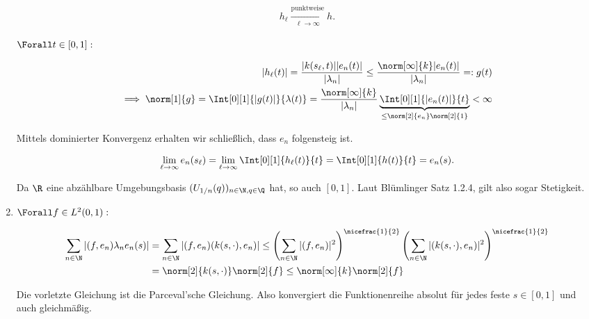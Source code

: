 \begin{solution}
\begin{enumerate}[label = (\alph*)]
  \begin{align*}
    h_\ell
    \xrightarrow
    [\ell \to \infty]
    {\text{punktweise}}
    h.
  \end{align*}

  $\Forall t \in [0, 1]:$

  \begin{align*}
    |h_\ell(t)|
    =
    \frac
    {
      |k(s_\ell, t)|
      |e_n(t)|
    }
    {|\lambda_n|}
    \leq
    \frac
    {
      \norm[\infty]{k}
      |e_n(t)|
    }
    {|\lambda_n|}
    =:
    g(t) \\
    \implies
    \norm[1]{g}
    =
    \Int[0][1]
    {|g(t)|}{\lambda(t)}
    =
    \frac
    {\norm[\infty]{k}}
    {|\lambda_n|}
    \underbrace
    {
      \Int[0][1]
      {|e_n(t)|}{t}
    }_{
      \leq
      \norm[2]{e_n}
      \norm[2]{1}
    }
    < \infty
  \end{align*}

  Mittels dominierter Konvergenz
  erhalten wir schließlich, dass $e_n$ folgensteig ist.

  \begin{align*}
    \lim_{\ell \to \infty}
    e_n(s_\ell)
    =
    \lim_{\ell \to \infty}
    \Int[0][1]{h_\ell(t)}{t}
    =
    \Int[0][1]{h(t)}{t}
    =
    e_n(s).
  \end{align*}


  Da $\R$ eine abzählbare Umgebungsbasis $(U_{1/n}(q))_{n \in \N, q \in \Q}$ hat, so auch $[0, 1]$.
  Laut Blümlinger Satz 1.2.4, gilt also sogar Stetigkeit.

  \item
  $\Forall f \in L^2(0, 1):$

  \begin{align*}
    \sum_{n \in \N}
    |(f, e_n)\lambda_n e_n(s)|
     &= \sum_{n \in \N}
     |(f, e_n)(k(s,\cdot),e_n)| \leq
     \left(\sum_{n \in \N}
     |(f, e_n)|^2\right)^{\nicefrac{1}{2}}
     \left(\sum_{n \in \N}|(k(s,\cdot),e_n)|^2\right)^{\nicefrac{1}{2}} \\
    &= \norm[2]{k(s,\cdot)}\norm[2]{f} \leq\norm[\infty]{k}\norm[2]{f}
  \end{align*}

  Die vorletzte Gleichung ist die Parceval'sche Gleichung.
  Also konvergiert die Funktionenreihe absolut für jedes feste $s \in [0,1]$
  und auch gleichmäßig. \\

\end{enumerate}

\end{solution}
